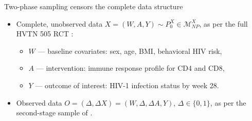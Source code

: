 \documentclass{beamer}
\begin{document}
\begin{frame}[c]{Two-phase sampling censors the complete data structure}

\begin{center}
\begin{itemize}
  \itemsep10pt
  \item Complete, unobserved data $X = (W, A, Y) \sim P_0^X \in
    \mathcal{M}^X_{NP}$, as per the full HVTN 505 RCT
    \citep{hammer2013efficacy}:
    \vspace{1em}
    \begin{itemize}
      \itemsep8pt
      \item $W$ --- baseline covariates: sex, age, BMI, behavioral HIV risk,
      \item $A$ --- intervention: immune response profile for CD4 and CD8,
      \item $Y$ --- outcome of interest: HIV-1 infection status by week 28.
    \end{itemize}
  \item Observed data $O = (\Delta, \Delta X) = (W, \Delta, \Delta A, Y)$,
    $\Delta \in \{0,1\}$, as per the second-stage sample of
    \cite{janes2017higher}.
\end{itemize}
\end{center}


\end{frame}

\end{document}
